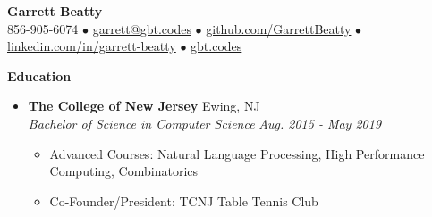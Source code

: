 \documentclass[letterpaper,10pt]{article}
\newcommand{\resitem}[1]{\item #1 \vspace{-2pt}}
\newcommand{\resheading}[1]{{\large \colorbox{mygrey}{\begin{minipage}{\textwidth}{\textbf{#1 \vphantom{p\^{E}}}}\end{minipage}}}}
\newcommand{\ressubheading}[4]{%
  \item\textbf{#1} \hfill #2\null\\
  \textit{#3} \hfill \textit{#4}%
  \vspace{-5pt}
}%
\begin{document}
\begin{center}
\textbf{\Huge Garrett Beatty} \\
\vspace{0.05in}
856-905-6074 $\bullet$ \href{mailto:garrett@gbt.codes}{garrett@gbt.codes} $\bullet$ \href{http://github.com/GarrettBeatty}{github.com/GarrettBeatty} $\bullet$ \href{http://linkedin.com/in/garrett-beatty}{linkedin.com/in/garrett-beatty} $\bullet$ \href{https://gbt.codes}{gbt.codes}
\end{center}

\vspace{-0.05in}

\resheading{Education}
\begin{itemize}

\ressubheading{The College of New Jersey}{Ewing, NJ}{Bachelor of Science in Computer Science}{Aug. 2015 - May 2019}
	\begin{itemize}
		\resitem{Advanced Courses: Natural Language Processing, High Performance Computing, Combinatorics}
		\resitem{Co-Founder/President: TCNJ Table Tennis Club}
	\end{itemize}
\end{itemize}
\end{document}
